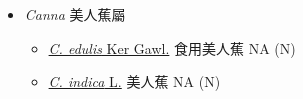 
  \begin{itemize}
 \item[] \textit{Canna} 美人蕉屬
                                
  \begin{itemize}
        \item[] \href{http://www.theplantlist.org/tpl1.1/search?q=Canna+edulis}{\textit{C. edulis} Ker Gawl.}   食用美人蕉   NA (N)
        \item[] \href{http://www.theplantlist.org/tpl1.1/search?q=Canna+indica}{\textit{C. indica} L.}   美人蕉   NA (N)
  \end{itemize}
  \end{itemize}
